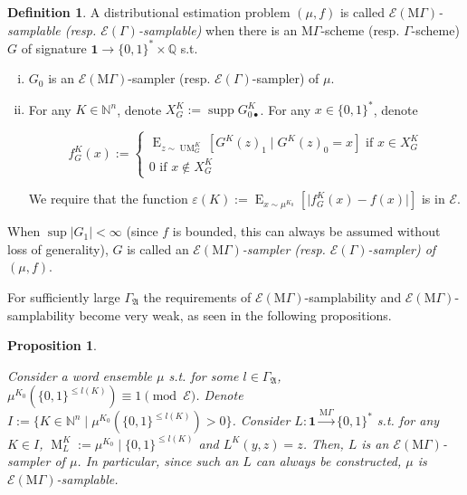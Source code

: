 \documentclass{article}
\numberwithin{equation}{section}
\theoremstyle{definition}
\newtheorem{definition}{Definition}[section]
\theoremstyle{plain}
\newtheorem{proposition}{Proposition}[section]
\newcommand{\Bool}{\{0,1\}}
\newcommand{\Words}{{\Bool^*}}
\DeclareMathOperator{\Supp}{supp}
\DeclareMathOperator{\E}{E}
\DeclareMathOperator{\M}{M}
\DeclareMathOperator{\UM}{UM}
\newcommand{\Nats}{\mathbb{N}}
\newcommand{\Rats}{\mathbb{Q}}
\newcommand{\Abs}[1]{\lvert #1 \rvert}
\newcommand{\GrowA}{\Gamma_{\mathfrak{A}}}
\newcommand{\MGrow}{\mathrm{M}\Gamma}
\newcommand{\Fall}{\mathcal{E}}
\newcommand{\EG}{\Fall(\Gamma)}
\newcommand{\EMG}{\Fall(\MGrow)}
\newcommand{\MScheme}{\xrightarrow{\MGrow}}
\begin{document}
\begin{samepage}
\begin{definition}

A distributional estimation problem $(\mu,f)$ is called \emph{$\EMG$-samplable (resp. $\EG$-samplable)} when there is an $\MGrow$-scheme (resp. $\Gamma$-scheme) $G$ of signature $\bm{1} \rightarrow \Words \times \Rats$ s.t. 

\begin{enumerate}[(i)]

\item $G_0$ is an $\EMG$-sampler (resp. $\EG$-sampler) of $\mu$.

\item For any $K \in \Nats^n$, denote $X_{G}^K:=\Supp G_{0\bullet}^K$. For any $x \in \Words$, denote 

$$f_G^K(x):=\begin{cases}\E_{z \sim\UM_G^K}[G^K(z)_1 \mid G^K(z)_0 = x] \text{ if } x \in X_{G}^K \\ 0 \text{ if } x \not\in X_{G}^K \end{cases}$$

We require that the function $\varepsilon(K):=\E_{x \sim \mu^{K_0}}[\Abs{f_G^K(x)-f(x)}]$ is in $\Fall$.

\end{enumerate}

When $\sup{\Abs{G_1}} < \infty$ (since $f$ is bounded, this can always be assumed without loss of generality), $G$ is called an \emph{$\EMG$-sampler (resp. $\EG$-sampler) of $(\mu,f)$}.

\end{definition}
\end{samepage}

For sufficiently large $\GrowA$ the requirements of $\EMG$-samplability and $\EMG$-samplability become very weak, as seen in the following propositions.

\begin{samepage}
\begin{proposition}
\label{prp:adv_mgamma_smp}

Consider a word ensemble $\mu$ s.t. for some $l \in \GrowA$, ${\mu^{K_0}(\Bool^{\leq l(K)}) \equiv 1 \pmod \Fall}$. Denote ${I:=\{K \in \Nats^n \mid \mu^{K_0}(\Bool^{\leq l(K)}) > 0\}}$. Consider ${L: \bm{1} \MScheme \Words}$ s.t. for any $K \in I$, $\M_L^K:=\mu^{K_0} \mid \Bool^{\leq l(K)}$ and ${L^K(y,z)=z}$.  Then, $L$ is an $\EMG$-sampler of $\mu$. In particular, since such an $L$ can always be constructed, $\mu$ is $\EMG$-samplable.

\end{proposition}
\end{samepage}
\end{document}
